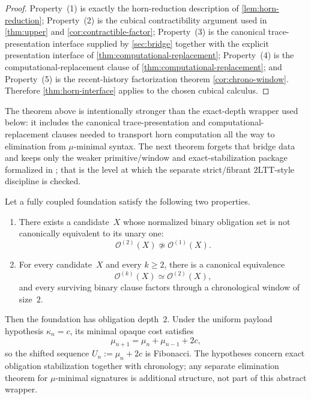 \documentclass{lmcs}
\newcommand{\Ocal}{\mathcal{O}}
\begin{document}
\begin{proof}
Property~(1) is exactly the horn-reduction description of \autoref{lem:horn-reduction}; Property~(2) is the cubical contractibility argument used in \autoref{thm:upper} and \autoref{cor:contractible-factor}; Property~(3) is the canonical trace-presentation interface supplied by \autoref{sec:bridge} together with the explicit presentation interface of \autoref{thm:computational-replacement}; Property~(4) is the computational-replacement clause of \autoref{thm:computational-replacement}; and Property~(5) is the recent-history factorization theorem \autoref{cor:chrono-window}. Therefore \autoref{thm:horn-interface} applies to the chosen cubical calculus.
\end{proof}

The theorem above is intentionally stronger than the exact-depth wrapper used below: it includes the canonical trace-presentation and computational-replacement clauses needed to transport horn computation all the way to elimination from $\mu$-minimal syntax. The next theorem forgets that bridge data and keeps only the weaker primitive/window and exact-stabilization package formalized in ; that is the level at which the separate strict/fibrant $2$LTT-style discipline is checked.

\begin{thm}
\label{thm:2d-foundations}
Let a fully coupled foundation satisfy the following two properties.
\begin{enumerate}
  \item There exists a candidate~$X$ whose normalized binary obligation set is not canonically equivalent to its unary one:
  \[
    \Ocal^{(2)}(X) \not\simeq \Ocal^{(1)}(X).
  \]
  \item For every candidate~$X$ and every $k \geq 2$, there is a canonical equivalence
  \[
    \Ocal^{(k)}(X) \simeq \Ocal^{(2)}(X),
  \]
  and every surviving binary clause factors through a chronological window of size~$2$.
\end{enumerate}
Then the foundation has obligation depth~$2$. Under the uniform payload hypothesis $\kappa_n=c$, its minimal opaque cost satisfies
\[
  \mu_{n+1} = \mu_n + \mu_{n-1} + 2c,
\]
so the shifted sequence $U_n := \mu_n + 2c$ is Fibonacci.
The hypotheses concern exact obligation stabilization together with chronology; any separate elimination theorem for $\mu$-minimal signatures is additional structure, not part of this abstract wrapper.
\end{thm}
\end{document}
